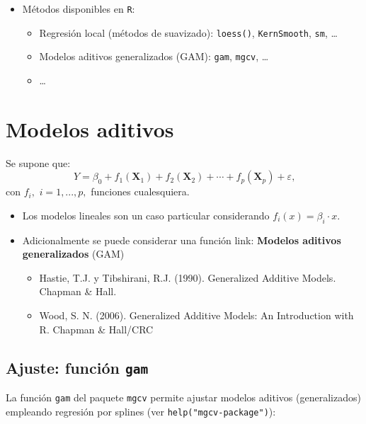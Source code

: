 \documentclass[]{book}
\begin{document}
\begin{itemize}
\item
  Métodos disponibles en \texttt{R}:

  \begin{itemize}
  \item
    Regresión local (métodos de suavizado): \texttt{loess()}, \texttt{KernSmooth}, \texttt{sm}, \ldots{}
  \item
    Modelos aditivos generalizados (GAM): \texttt{gam}, \texttt{mgcv}, \ldots{}
  \item
    \ldots{}
  \end{itemize}
\end{itemize}

\hypertarget{modelos-aditivos}{%
\section{Modelos aditivos}\label{modelos-aditivos}}

Se supone que:
\[Y=\beta_{0}+f_{1}\left(  \mathbf{X}_{1}\right)  +f_{2}\left(  \mathbf{X}_{2}\right)  +\cdots+f_{p}\left(  \mathbf{X}_{p}\right)  +\varepsilon\text{,}\]
con \(f_{i},\) \(i=1,...,p,\) funciones cualesquiera.

\begin{itemize}
\item
  Los modelos lineales son un caso particular considerando \(f_{i}(x) = \beta_{i}·x\).
\item
  Adicionalmente se puede considerar una función link: \textbf{Modelos aditivos generalizados} (GAM)

  \begin{itemize}
  \item
    Hastie, T.J. y Tibshirani, R.J. (1990). Generalized Additive Models. Chapman \& Hall.
  \item
    Wood, S. N. (2006). Generalized Additive Models: An Introduction with R. Chapman \& Hall/CRC
  \end{itemize}
\end{itemize}

\hypertarget{ajuste-funcion-gam}{%
\subsection{\texorpdfstring{Ajuste: función \texttt{gam}}{Ajuste: función gam}}\label{ajuste-funcion-gam}}

La función \texttt{gam} del paquete \texttt{mgcv} permite ajustar modelos aditivos (generalizados) empleando regresión por splines (ver \texttt{help("mgcv-package")}):
\end{document}
